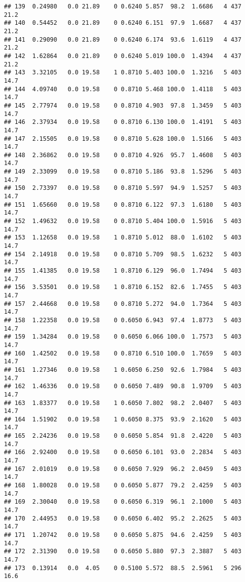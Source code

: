\documentclass[]{article}
\begin{document}
\begin{verbatim}
## 139  0.24980   0.0 21.89    0 0.6240 5.857  98.2  1.6686   4 437    21.2
## 140  0.54452   0.0 21.89    0 0.6240 6.151  97.9  1.6687   4 437    21.2
## 141  0.29090   0.0 21.89    0 0.6240 6.174  93.6  1.6119   4 437    21.2
## 142  1.62864   0.0 21.89    0 0.6240 5.019 100.0  1.4394   4 437    21.2
## 143  3.32105   0.0 19.58    1 0.8710 5.403 100.0  1.3216   5 403    14.7
## 144  4.09740   0.0 19.58    0 0.8710 5.468 100.0  1.4118   5 403    14.7
## 145  2.77974   0.0 19.58    0 0.8710 4.903  97.8  1.3459   5 403    14.7
## 146  2.37934   0.0 19.58    0 0.8710 6.130 100.0  1.4191   5 403    14.7
## 147  2.15505   0.0 19.58    0 0.8710 5.628 100.0  1.5166   5 403    14.7
## 148  2.36862   0.0 19.58    0 0.8710 4.926  95.7  1.4608   5 403    14.7
## 149  2.33099   0.0 19.58    0 0.8710 5.186  93.8  1.5296   5 403    14.7
## 150  2.73397   0.0 19.58    0 0.8710 5.597  94.9  1.5257   5 403    14.7
## 151  1.65660   0.0 19.58    0 0.8710 6.122  97.3  1.6180   5 403    14.7
## 152  1.49632   0.0 19.58    0 0.8710 5.404 100.0  1.5916   5 403    14.7
## 153  1.12658   0.0 19.58    1 0.8710 5.012  88.0  1.6102   5 403    14.7
## 154  2.14918   0.0 19.58    0 0.8710 5.709  98.5  1.6232   5 403    14.7
## 155  1.41385   0.0 19.58    1 0.8710 6.129  96.0  1.7494   5 403    14.7
## 156  3.53501   0.0 19.58    1 0.8710 6.152  82.6  1.7455   5 403    14.7
## 157  2.44668   0.0 19.58    0 0.8710 5.272  94.0  1.7364   5 403    14.7
## 158  1.22358   0.0 19.58    0 0.6050 6.943  97.4  1.8773   5 403    14.7
## 159  1.34284   0.0 19.58    0 0.6050 6.066 100.0  1.7573   5 403    14.7
## 160  1.42502   0.0 19.58    0 0.8710 6.510 100.0  1.7659   5 403    14.7
## 161  1.27346   0.0 19.58    1 0.6050 6.250  92.6  1.7984   5 403    14.7
## 162  1.46336   0.0 19.58    0 0.6050 7.489  90.8  1.9709   5 403    14.7
## 163  1.83377   0.0 19.58    1 0.6050 7.802  98.2  2.0407   5 403    14.7
## 164  1.51902   0.0 19.58    1 0.6050 8.375  93.9  2.1620   5 403    14.7
## 165  2.24236   0.0 19.58    0 0.6050 5.854  91.8  2.4220   5 403    14.7
## 166  2.92400   0.0 19.58    0 0.6050 6.101  93.0  2.2834   5 403    14.7
## 167  2.01019   0.0 19.58    0 0.6050 7.929  96.2  2.0459   5 403    14.7
## 168  1.80028   0.0 19.58    0 0.6050 5.877  79.2  2.4259   5 403    14.7
## 169  2.30040   0.0 19.58    0 0.6050 6.319  96.1  2.1000   5 403    14.7
## 170  2.44953   0.0 19.58    0 0.6050 6.402  95.2  2.2625   5 403    14.7
## 171  1.20742   0.0 19.58    0 0.6050 5.875  94.6  2.4259   5 403    14.7
## 172  2.31390   0.0 19.58    0 0.6050 5.880  97.3  2.3887   5 403    14.7
## 173  0.13914   0.0  4.05    0 0.5100 5.572  88.5  2.5961   5 296    16.6

\end{verbatim}
\end{document}
